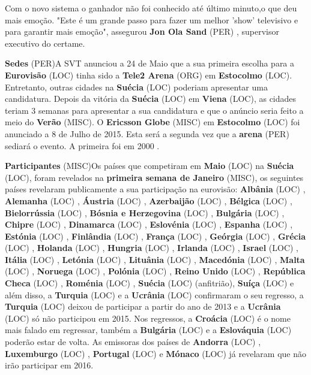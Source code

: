 \documentclass[12pt,a4paper]{article}
\begin{document}
Com o novo sistema o ganhador não foi conhecido até último minuto,o que deu mais emoção. "Este é um grande passo para fazer um melhor 'show' televisivo e para garantir mais emoção", assegurou \textbf{Jon Ola Sand} (PER) , supervisor executivo do certame.



\textbf{Sedes} (PER)A SVT anunciou a 24 de Maio que a sua primeira escolha para a \textbf{Eurovisão} (LOC) tinha sido a \textbf{Tele2 Arena} (ORG) em \textbf{Estocolmo} (LOC). Entretanto, outras cidades na \textbf{Suécia} (LOC) poderiam apresentar uma candidatura. Depois da vitória da \textbf{Suécia} (LOC) em \textbf{Viena} (LOC), as cidades teriam 3 semanas para apresentar a sua candidatura e que o anúncio seria feito a meio do \textbf{Verão} (MISC). O \textbf{Ericsson Globe} (MISC) em \textbf{Estocolmo} (LOC) foi anunciado a 8 de Julho de 2015. Esta será a segunda vez que a \textbf{arena} (PER) sediará o evento. A primeira foi em 2000 .



\textbf{Participantes} (MISC)Os países que competiram em \textbf{Maio} (LOC) na \textbf{Suécia} (LOC), foram revelados na \textbf{primeira semana de Janeiro} (MISC), os seguintes países revelaram publicamente a sua participação na eurovisão: \textbf{Albânia} (LOC) , \textbf{Alemanha} (LOC) , \textbf{Áustria} (LOC) , \textbf{Azerbaijão} (LOC) , \textbf{Bélgica} (LOC) , \textbf{Bielorrússia} (LOC) , \textbf{Bósnia e Herzegovina} (LOC) , \textbf{Bulgária} (LOC) , \textbf{Chipre} (LOC) , \textbf{Dinamarca} (LOC) , \textbf{Eslovénia} (LOC) , \textbf{Espanha} (LOC) , \textbf{Estónia} (LOC) , \textbf{Finlândia} (LOC) , \textbf{França} (LOC) , \textbf{Geórgia} (LOC) , \textbf{Grécia} (LOC) , \textbf{Holanda} (LOC) , \textbf{Hungria} (LOC) , \textbf{Irlanda} (LOC) , \textbf{Israel} (LOC) , \textbf{Itália} (LOC) , \textbf{Letónia} (LOC) , \textbf{Lituânia} (LOC) , \textbf{Macedónia} (LOC) , \textbf{Malta} (LOC) , \textbf{Noruega} (LOC) , \textbf{Polónia} (LOC) , \textbf{Reino Unido} (LOC) , \textbf{República Checa} (LOC) , \textbf{Roménia} (LOC) , \textbf{Suécia} (LOC) (anfitrião), \textbf{Suíça} (LOC) e além disso, a \textbf{Turquia} (LOC) e a \textbf{Ucrânia} (LOC) confirmaram o seu regresso, a \textbf{Turquia} (LOC) deixou de participar a partir do ano de 2013 e a \textbf{Ucrânia} (LOC) só não participou em 2015. Nos regressos, a \textbf{Croácia} (LOC) é o nome mais falado em regressar, também a \textbf{Bulgária} (LOC) e a \textbf{Eslováquia} (LOC) poderão estar de volta. As emissoras dos países de \textbf{Andorra} (LOC) , \textbf{Luxemburgo} (LOC) , \textbf{Portugal} (LOC) e \textbf{Mónaco} (LOC) já revelaram que não irão participar em 2016.
\end{document}
